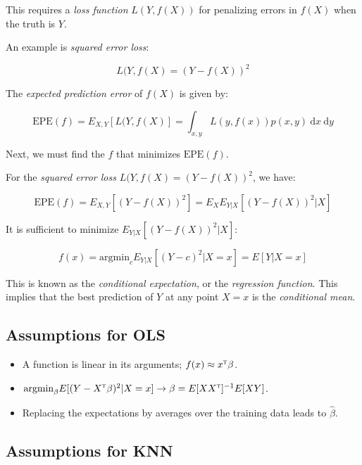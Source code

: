 \documentclass[twoside,twocolumn,10pt]{revtex4-1}
\begin{document}
	This requires a \textit{loss function} $L(Y,f(X))$ for penalizing errors in $f(X)$ when the truth is $Y$.
	
	An example is \textit{squared error loss}:
	
	\begin{equation*}
	L(Y,f(X) = (Y - f(X))^2
	\end{equation*}	 
	
	The \textit{expected prediction error} of $f(X)$ is given by:
	
	\begin{equation*}
	\text{EPE}(f) = E_{X,Y} [L(Y,f(X)] = \int_{x,y} L(y,f(x)) p(x,y) \ \text{d}x \ \text{d}y
	\end{equation*}
	
	Next, we must find the $f$ that minimizes $\text{EPE}(f)$.
	
	For the \textit{squared error loss} $L(Y,f(X) = (Y - f(X))^2$, we have:
	
	\begin{equation*}
	\text{EPE}(f) = E_{X,Y} [(Y - f(X))^2] = E_X E_{Y|X} [(Y - f(X))^2 | X] 
	\end{equation*}
	
	It is sufficient to minimize $E_{Y|X} [(Y - f(X))^2 | X]$:
	
	\begin{equation*}
	f(x) = \text{argmin}_c E_{Y|X} [(Y - c)^2 | X = x] = E[Y|X=x]
	\end{equation*}
	
	This is known as the \textit{conditional expectation}, or the \textit{regression function}.  This implies that the best prediction of $Y$ at any point $X = x$ is the \textit{conditional mean}.
	
	\subsection{Assumptions for OLS}
	
	\begin{itemize}
	\item A function is linear in its arguments; $f(x) \approx x^\textsc{t} \beta$.
	\item $\text{argmin}_\beta E [(Y - X^\textsc{t}\beta)^2 | X = x] \to \beta = E[XX^\textsc{t}]^{-1} E[XY]$.
	\item Replacing the expectations by averages over the training data leads to $\hat{\beta}$.
	\end{itemize}
	
	\subsection{Assumptions for KNN}
	
\end{document}
